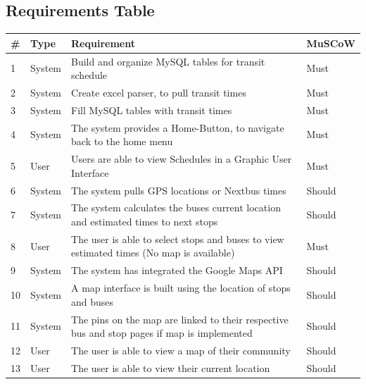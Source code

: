 \documentclass[a4paper,12pt]{article}
\begin{document}
\subsection{Requirements Table}
\begin{tabular}{p{0.4cm}|p{2cm}|p{8cm}|p{1.7cm}}
\# &Type&Requirement&MuSCoW\\
\hline
1 & System & Build and organize MySQL tables for transit schedule & Must \\
\hline
2 & System & Create excel parser, to pull transit times & Must \\
\hline
3 & System & Fill MySQL tables with transit times & Must \\
\hline
4 & System & The system provides a Home-Button, to navigate back to the home menu & Must \\
\hline
5 & User & Users are able to view Schedules in a Graphic User Interface & Must \\
\hline
6 & System & The system pulls GPS locations or Nextbus times & Should \\
\hline
7 & System & The system calculates the buses current location and estimated times to next stops & Should \\
\hline
8 & User & The user is able to select stops and buses to view estimated times (No map is available) & Must \\
\hline
9 & System & The system has integrated the Google Maps API & Should \\
\hline
10 & System & A map interface is built using the location of stops and buses & Should \\
\hline
11 & System & The pins on the map are linked to their respective bus and stop pages if map is implemented & Should \\
\hline
12 & User & The user is able to view a map of their community & Should \\
\hline
13 & User & The user is able to view their current location & Should \\
\hline


\end{tabular}

\pagebreak
\end{document}
